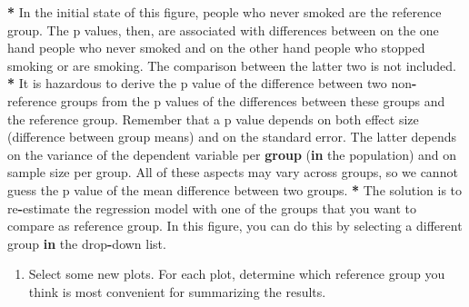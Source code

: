 \documentclass[a4paper]{book}
\newenvironment{Shaded}{\begin{snugshade}}{\end{snugshade}}
\newcommand{\KeywordTok}[1]{\textcolor[rgb]{0,0,0}{\textbf{#1}}}
\newcommand{\StringTok}[1]{\textcolor[rgb]{0.00,0.00,0.00}{#1}}
\newcommand{\ControlFlowTok}[1]{\textcolor[rgb]{0.00,0.00,0.00}{\textbf{#1}}}
\newcommand{\OperatorTok}[1]{\textcolor[rgb]{0.00,0.00,0.00}{\textbf{#1}}}
\newcommand{\NormalTok}[1]{#1}
\providecommand{\tightlist}{%
  \setlength{\itemsep}{0pt}\setlength{\parskip}{0pt}}
\theoremstyle{definition}
\theoremstyle{definition}
\theoremstyle{definition}
\theoremstyle{remark}
\begin{document}
\begin{Shaded}
\begin{Highlighting}[]
\OperatorTok{*}\StringTok{ }\NormalTok{In the initial state of this figure, people who never smoked are the}
\NormalTok{reference group. The p values, then, are associated with differences between on}
\NormalTok{the one hand people who never smoked and on the other hand people who stopped}
\NormalTok{smoking or are smoking. The comparison between the latter two is not included.}
\OperatorTok{*}\StringTok{ }\NormalTok{It is hazardous to derive the p value of the difference between two}
\NormalTok{non}\OperatorTok{-}\NormalTok{reference groups from the p values of the differences between these groups}
\NormalTok{and the reference group. Remember that a p value depends on both effect size}
\NormalTok{(difference between group means) and on the standard error. The latter depends}
\NormalTok{on the variance of the dependent variable per }\KeywordTok{group}\NormalTok{ (}\ControlFlowTok{in}\NormalTok{ the population) and on}
\NormalTok{sample size per group. All of these aspects may vary across groups, so we}
\NormalTok{cannot guess the p value of the mean difference between two groups.}
\OperatorTok{*}\StringTok{ }\NormalTok{The solution is to re}\OperatorTok{-}\NormalTok{estimate the regression model with one of the groups}
\NormalTok{that you want to compare as reference group. In this figure, you can do this by}
\NormalTok{selecting a different group }\ControlFlowTok{in}\NormalTok{ the drop}\OperatorTok{-}\NormalTok{down list.}
\end{Highlighting}
\end{Shaded}

\begin{enumerate}
\def\labelenumi{\arabic{enumi}.}
\setcounter{enumi}{2}
\tightlist
\item
  Select some new plots. For each plot, determine which reference group
  you think is most convenient for summarizing the results.
\end{enumerate}
\end{document}
